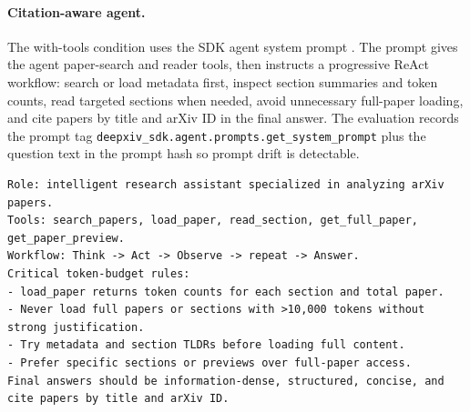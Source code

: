 \documentclass[10pt]{article}
\begin{document}
\paragraph{Citation-aware agent.}
The with-tools condition uses the SDK agent system prompt . The prompt gives the agent paper-search and reader tools, then instructs a progressive ReAct workflow: search or load metadata first, inspect section summaries and token counts, read targeted sections when needed, avoid unnecessary full-paper loading, and cite papers by title and arXiv ID in the final answer. The evaluation records the prompt tag \texttt{deepxiv\_sdk.agent.prompts.get\_system\_prompt} plus the question text in the prompt hash so prompt drift is detectable.
\begin{lstlisting}[style=terminal]
Role: intelligent research assistant specialized in analyzing arXiv papers.
Tools: search_papers, load_paper, read_section, get_full_paper, get_paper_preview.
Workflow: Think -> Act -> Observe -> repeat -> Answer.
Critical token-budget rules:
- load_paper returns token counts for each section and total paper.
- Never load full papers or sections with >10,000 tokens without strong justification.
- Try metadata and section TLDRs before loading full content.
- Prefer specific sections or previews over full-paper access.
Final answers should be information-dense, structured, concise, and cite papers by title and arXiv ID.
\end{lstlisting}
\end{document}
